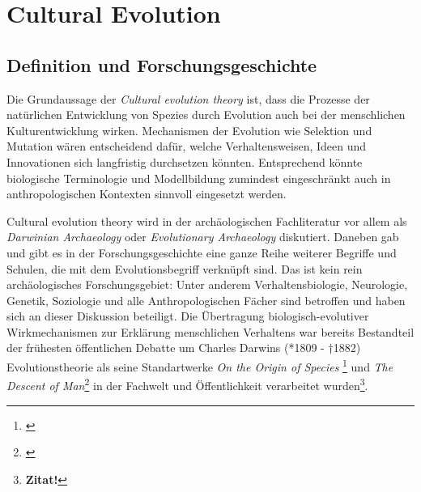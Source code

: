 \documentclass[openany,twoside,twocolumn]{book}
\let\rmarkdownfootnote\footnote%
\def\footnote{\protect\rmarkdownfootnote}
\begin{document}
\hypertarget{cultural-evolution}{%
\chapter{Cultural Evolution}\label{cultural-evolution}}

\hypertarget{definition-und-forschungsgeschichte}{%
\section{Definition und
Forschungsgeschichte}\label{definition-und-forschungsgeschichte}}

Die Grundaussage der \emph{Cultural evolution theory} ist, dass die
Prozesse der natürlichen Entwicklung von Spezies durch Evolution auch
bei der menschlichen Kulturentwicklung wirken. Mechanismen der Evolution
wie Selektion und Mutation wären entscheidend dafür, welche
Verhaltensweisen, Ideen und Innovationen sich langfristig durchsetzen
könnten. Entsprechend könnte biologische Terminologie und Modellbildung
zumindest eingeschränkt auch in anthropologischen Kontexten sinnvoll
eingesetzt werden.

Cultural evolution theory wird in der archäologischen Fachliteratur vor
allem als \emph{Darwinian Archaeology} oder \emph{Evolutionary
Archaeology} diskutiert. Daneben gab und gibt es in der
Forschungsgeschichte eine ganze Reihe weiterer Begriffe und Schulen, die
mit dem Evolutionsbegriff verknüpft sind. Das ist kein rein
archäologisches Forschungsgebiet: Unter anderem Verhaltensbiologie,
Neurologie, Genetik, Soziologie und alle Anthropologischen Fächer sind
betroffen und haben sich an dieser Diskussion beteiligt. Die Übertragung
biologisch-evolutiver Wirkmechanismen zur Erklärung menschlichen
Verhaltens war bereits Bestandteil der frühesten öffentlichen Debatte um
Charles Darwins (*1809 - †1882) Evolutionstheorie als seine
Standartwerke \emph{On the Origin of Species} \footnote{\textcite{Darwinoriginspeciesmeans1859}}
und \emph{The Descent of Man}\footnote{\textcite{Darwindescentmanselection1871}}
in der Fachwelt und Öffentlichkeit verarbeitet wurden\footnote{\textbf{Zitat!}}.
\end{document}
